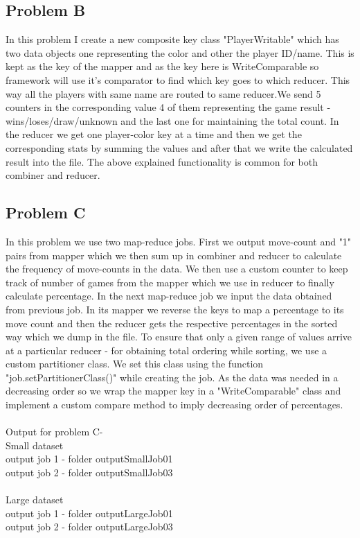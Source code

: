 \documentclass{article}
\begin{document}
\begin{titlepage}
\subsection{Problem B}
In this problem I create a new composite key class "PlayerWritable" which has two data objects one representing the color and other the player ID/name. This is kept as the key of the mapper and as the key here is WriteComparable so framework will use it's comparator to find which key goes to which reducer. This way all the players with same name are routed to same reducer.We send 5 counters in the corresponding value 4 of them representing the game result - wins/loses/draw/unknown and the last one for maintaining the total count. In the reducer we get one player-color key at a time and then we get the corresponding stats by summing the values and after that we write the calculated result into the file. The above explained functionality is common for both combiner and reducer.

\subsection{Problem C}
In this problem we use two map-reduce jobs. First we output move-count and "1" pairs from mapper which we then sum up in combiner and reducer to calculate the frequency of move-counts in the data. We then use a custom counter to keep track of number of games from the mapper which we use in reducer to finally calculate percentage. In the next map-reduce job we input the data obtained from previous job. In its mapper we reverse the keys to map a percentage to its move count and then the reducer gets the respective percentages in the sorted way which we dump in the file. To ensure that only a given range of values arrive at a particular reducer - for obtaining total ordering while sorting, we use a custom partitioner class. We set this class using the function "job.setPartitionerClass()" while creating the job. As the data was needed in a decreasing order so we wrap the mapper key in a "WriteComparable" class and implement a custom compare method to imply decreasing order of percentages. \\\\
Output for problem C-\\
Small dataset\\
output job 1 - folder outputSmallJob01\\
output job 2 - folder outputSmallJob03\\
\\
Large dataset\\
output job 1 - folder outputLargeJob01\\
output job 2 - folder outputLargeJob03\\



\end{titlepage}
\end{document}
